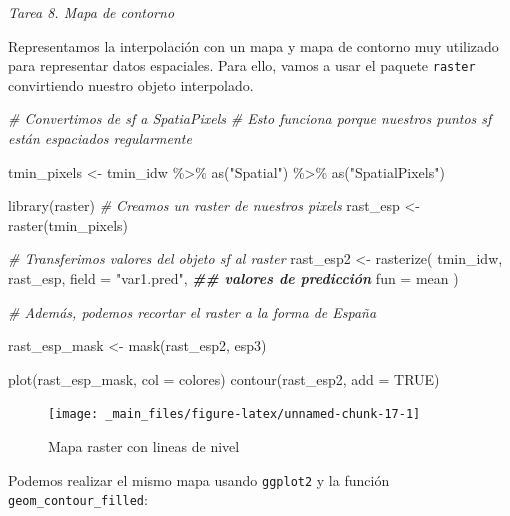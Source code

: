 \documentclass[
]{book}
\newenvironment{Shaded}{\begin{snugshade}}{\end{snugshade}}
\newcommand{\AttributeTok}[1]{\textcolor[rgb]{0.77,0.63,0.00}{#1}}
\newcommand{\CommentTok}[1]{\textcolor[rgb]{0.56,0.35,0.01}{\textit{#1}}}
\newcommand{\ConstantTok}[1]{\textcolor[rgb]{0.00,0.00,0.00}{#1}}
\newcommand{\DocumentationTok}[1]{\textcolor[rgb]{0.56,0.35,0.01}{\textbf{\textit{#1}}}}
\newcommand{\FunctionTok}[1]{\textcolor[rgb]{0.00,0.00,0.00}{#1}}
\newcommand{\NormalTok}[1]{#1}
\newcommand{\OtherTok}[1]{\textcolor[rgb]{0.56,0.35,0.01}{#1}}
\newcommand{\SpecialCharTok}[1]{\textcolor[rgb]{0.00,0.00,0.00}{#1}}
\newcommand{\StringTok}[1]{\textcolor[rgb]{0.31,0.60,0.02}{#1}}
\begin{document}
\emph{Tarea 8. Mapa de contorno}

Representamos la interpolación con un mapa y mapa de contorno muy utilizado para
representar datos espaciales. Para ello, vamos a usar el paquete \texttt{raster}
convirtiendo nuestro objeto interpolado.

\begin{Shaded}
\begin{Highlighting}[]
\CommentTok{\# Convertimos de sf a SpatiaPixels}
\CommentTok{\# Esto funciona porque nuestros puntos sf están espaciados regularmente}

\NormalTok{tmin\_pixels }\OtherTok{\textless{}{-}}\NormalTok{ tmin\_idw }\SpecialCharTok{\%\textgreater{}\%}
  \FunctionTok{as}\NormalTok{(}\StringTok{"Spatial"}\NormalTok{) }\SpecialCharTok{\%\textgreater{}\%}
  \FunctionTok{as}\NormalTok{(}\StringTok{"SpatialPixels"}\NormalTok{)}


\FunctionTok{library}\NormalTok{(raster)}
\CommentTok{\# Creamos un raster de nuestros pixels}
\NormalTok{rast\_esp }\OtherTok{\textless{}{-}} \FunctionTok{raster}\NormalTok{(tmin\_pixels)}

\CommentTok{\# Transferimos valores del objeto sf al raster}
\NormalTok{rast\_esp2 }\OtherTok{\textless{}{-}} \FunctionTok{rasterize}\NormalTok{(}
\NormalTok{  tmin\_idw,}
\NormalTok{  rast\_esp,}
  \AttributeTok{field =} \StringTok{"var1.pred"}\NormalTok{, }\DocumentationTok{\#\# valores de predicción}
  \AttributeTok{fun =}\NormalTok{ mean}
\NormalTok{)}

\CommentTok{\# Además, podemos recortar el raster a la forma de España}

\NormalTok{rast\_esp\_mask }\OtherTok{\textless{}{-}} \FunctionTok{mask}\NormalTok{(rast\_esp2, esp3)}

\FunctionTok{plot}\NormalTok{(rast\_esp\_mask, }\AttributeTok{col =}\NormalTok{ colores)}
\FunctionTok{contour}\NormalTok{(rast\_esp2, }\AttributeTok{add =} \ConstantTok{TRUE}\NormalTok{)}
\end{Highlighting}
\end{Shaded}

\begin{figure}

{\centering \texttt{[image: \_main\_files/figure-latex/unnamed-chunk-17-1]} 

}

\caption{Mapa raster con lineas de nivel}\label{fig:unnamed-chunk-17}
\end{figure}

Podemos realizar el mismo mapa usando \texttt{ggplot2} y la función
\texttt{geom\_contour\_filled}:
\end{document}
